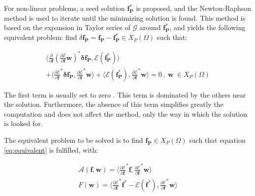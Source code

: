 \documentclass{CFD2011}
\begin{document}
For non-linear problems, a seed solution $\mathbf{f^*_P}$ is proposed, and the Newton-Raphson method is used to iterate until the minimizing solution is found. This method is based on the expansion in Taylor series of $\mathcal{G}$ around $\mathbf{f^*_P}$, and yields the following equivalent problem: find $\delta\mathbf{f_P}=\mathbf{f_P}-\mathbf{f^*_P} \in X_P(\Omega)$ such that:

\begin{eqnarray}
\big\langle \frac{\partial}{\partial \mathbf{f}} \left(\frac{\partial\mathcal{E}}{\partial \mathbf{f}}\mathbf{w}\right)^*\mathbf{\delta f_P} , \mathcal{E}(\mathbf{f^*_P}) \big\rangle  \nonumber \\
+\big\langle \frac{\partial \mathcal{E}}{\partial \mathbf{f}}^*\mathbf{\delta f_P} , \frac{\partial \mathcal{E}}{\partial \mathbf{f}}^*\mathbf{w} \big\rangle +
\big\langle \mathcal{E}(\mathbf{f^*_P}) , \frac{\partial \mathcal{E}}{\partial \mathbf{f}}^*\mathbf{w} \big\rangle =0 \ ,\ \mathbf{w} \ \in X_P(\Omega)
\end{eqnarray}

The first term is usually set to zero \cite{Winterscheidt1994, Codd2001}. This term is dominated by the others near the solution. Furthermore, the absence of this term simplifies greatly the computation and does not affect the method, only the way in which the solution is looked for.

The equivalent problem to be solved is to find $\mathbf{f_P} \in X_P(\Omega)$ such that equation \ref{eq:equivalent} is fulfilled, with:


\begin{eqnarray}
\mathcal{A}(\mathbf{f},\mathbf{w})= \big\langle \frac{\partial \mathcal{E}}{\partial \mathbf{f}}^*\mathbf{f} ,  \frac{\partial \mathcal{E}}{\partial \mathbf{f}}^*\mathbf{w} \big\rangle \nonumber \\
F(\mathbf{w})= \big\langle \frac{\partial \mathcal{E}}{\partial \mathbf{f}}^*\mathbf{f^*}-\mathcal{E}(\mathbf{f^*}) , \frac{\partial \mathcal{E}}{\partial \mathbf{f}}^*\mathbf{w} \big\rangle 
\label{eq:equivNR}
\end{eqnarray}

\end{document}
